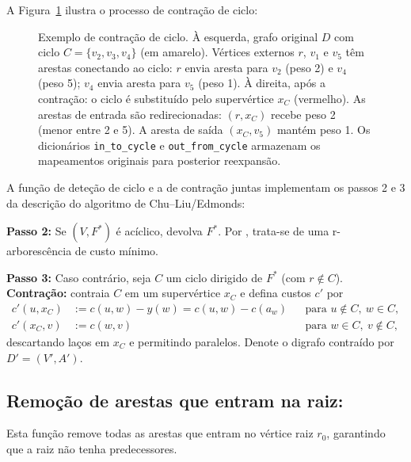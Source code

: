 A Figura~\ref{fig:contract-cycle-example} ilustra o processo de contração de ciclo:

\begin{figure}[H]
    \centering
    
    \caption{Exemplo de contração de ciclo. À esquerda, grafo original \(D\) com ciclo \(C=\{v_2, v_3, v_4\}\) (em amarelo). Vértices externos \(r\), \(v_1\) e \(v_5\) têm arestas conectando ao ciclo: \(r\) envia aresta para \(v_2\) (peso 2) e \(v_4\) (peso 5); \(v_4\) envia aresta para \(v_5\) (peso 1). À direita, após a contração: o ciclo é substituído pelo supervértice \(x_C\) (vermelho). As arestas de entrada são redirecionadas: \((r, x_C)\) recebe peso 2 (menor entre 2 e 5). A aresta de saída \((x_C, v_5)\) mantém peso 1. Os dicionários \texttt{in\_to\_cycle} e \texttt{out\_from\_cycle} armazenam os mapeamentos originais para posterior reexpansão.}
    \label{fig:contract-cycle-example}
\end{figure}

A função de deteção de ciclo e a de contração juntas implementam os passos 2 e 3 da descrição do algoritmo de Chu–Liu/Edmonds:

\begin{tcolorbox}[
        enhanced, breakable,
        colframe=green!60!black, colback=green!5,
        colbacktitle=green!20, coltitle=black,
        title={Passos 2 e 3 do Algoritmo de Chu–Liu/Edmonds},
        boxed title style={sharp corners, boxrule=0.6pt},
        sharp corners, boxrule=0.6pt
    ]
    \textbf{Passo 2:} Se \((V,F^*)\) é acíclico, devolva \(F^*\). Por \cite[Obs.~4.36]{kleinberg2006}, trata-se de uma r-arborescência de custo mínimo.

    \textbf{Passo 3:} Caso contrário, seja \(C\) um ciclo dirigido de \(F^*\) (com \(r\notin C\)). \textbf{Contração:} contraia \(C\) em um supervértice \(x_C\) e defina custos \(c'\) por
    \begin{align*}
        c'(u,x_C) & := c(u,w) - y(w) = c(u,w) - c(a_w) &  & \text{para } u\notin C,\ w\in C, \\
        c'(x_C,v) & := c(w,v)                          &  & \text{para } w\in C,\ v\notin C,
    \end{align*}
    descartando laços em \(x_C\) e permitindo paralelos. Denote o digrafo contraído por \(D'=(V',A')\).
\end{tcolorbox}

\subsection{Remoção de arestas que entram na raiz:}
Esta função remove todas as arestas que entram no vértice raiz \(r_0\), garantindo que a raiz não tenha predecessores.

